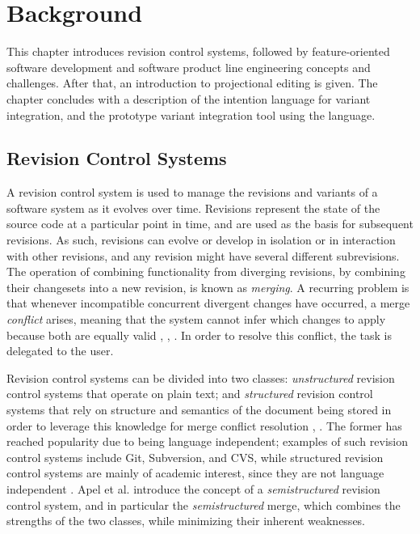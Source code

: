 \chapter{Background}

This chapter introduces revision control systems, followed by feature-oriented software development and software product line engineering concepts and challenges. After that, an introduction to projectional editing is given. The chapter concludes with a description of the intention language for variant integration, and the prototype variant integration tool using the language.

\section{Revision Control Systems}
A revision control system is used to manage the revisions and variants of a software system as it evolves over time. Revisions represent the state of the source code at a particular point in time, and are used as the basis for subsequent revisions. As such, revisions can evolve or develop in isolation or in interaction with other revisions, and any revision might have several different subrevisions. The operation of combining functionality from diverging revisions, by combining their changesets into a new revision, is known as \textit{merging}. A recurring problem is that whenever incompatible concurrent divergent changes have occurred, a merge \textit{conflict} arises, meaning that the system cannot infer which changes to apply because both are equally valid \cite{mens2002}, \cite{apel2011}, \cite{buckley2005}. In order to resolve this conflict, the task is delegated to the user.

Revision control systems can be divided into two classes: \textit{unstructured} revision control systems that operate on plain text; and \textit{structured} revision control systems that rely on structure and semantics of the document being stored in order to leverage this knowledge for merge conflict resolution \cite{mens2002}, \cite{apel2011}. The former has reached popularity due to being language independent; examples of such revision control systems include Git, Subversion, and CVS, while structured revision control systems are mainly of academic interest, since they are not language independent \cite{apel2011}. Apel et al. \cite{apel2011} introduce the concept of a \textit{semistructured} revision control system, and in particular the \textit{semistructured} merge, which combines the strengths of the two classes, while minimizing their inherent weaknesses.

